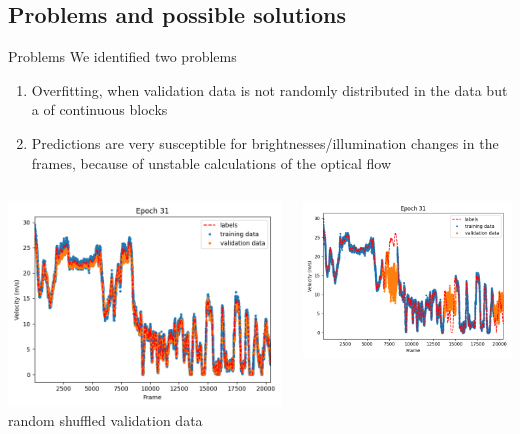 \subsection{Problems and possible solutions}
\begin{frame}{Problems}
	We identified two problems
	\begin{enumerate}
		\item Overfitting, when validation data is not randomly distributed in the data but a of continuous blocks
		\item Predictions are very susceptible for brightnesses/illumination changes in the frames, because of unstable calculations of the optical flow
	\end{enumerate}
	\begin{columns}[c]
		\begin{column}{0.5\textwidth}
			\begin{center}
			\includegraphics[width=\textwidth]{imgs/siamese_offrames_performance_shuffle.png}
			random shuffled validation data
			\end{center}
		\end{column}
		\begin{column}{0.5\textwidth}
			\begin{center}
			\includegraphics[width=\textwidth]{imgs/siamese_offrames_performance.png}

\end{center}
\end{column}
\end{columns}
\end{frame}
